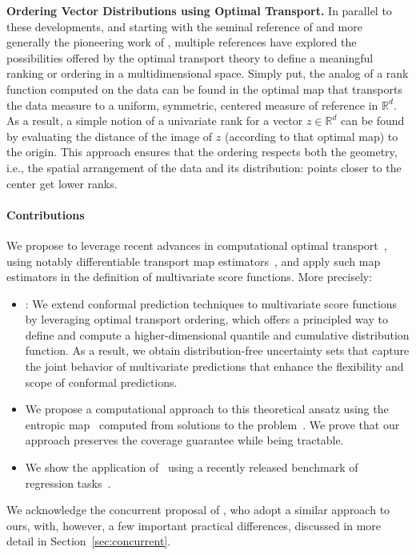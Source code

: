 \textbf{Ordering Vector Distributions using Optimal Transport.} In parallel to these developments, and starting with the seminal reference of \citep{chernozhukov2017} and more generally the pioneering work of \citep{hallin2021,hallin2022center,hallin2023efficient}, multiple references have explored the possibilities offered by the optimal transport theory to define a meaningful ranking or ordering in a multidimensional space. Simply put, the analog of a rank function computed on the data can be found in the optimal \citeauthor{Bre91} map that transports the data measure to a uniform, symmetric, centered measure of reference in $\mathbb{R}^d$. As a result, a simple notion of a univariate rank for a vector $z\in\mathbb{R}^d$ can be found by evaluating the distance of the image of $z$ (according to that optimal map) to the origin. This approach ensures that the ordering respects both the geometry, i.e., the spatial arrangement of the data and its distribution: points closer to the center get lower ranks.

\paragraph{Contributions}
We propose to leverage recent advances in computational optimal transport~\citep{PeyCut19}, using notably differentiable transport map estimators~\citep{pooladian2021entropic,cuturi2019differentiable}, and apply such map estimators in the definition of multivariate score functions. More precisely:
\begin{itemize}[leftmargin=.2cm,itemsep=.0cm,topsep=0cm,parsep=2pt]
\item \OTCP: We extend conformal prediction techniques to multivariate score functions by leveraging optimal transport ordering, which offers a principled way to define and compute a higher-dimensional quantile and cumulative distribution function. As a result, we obtain distribution-free uncertainty sets that capture the joint behavior of multivariate predictions that enhance the flexibility and scope of conformal predictions.
\item We propose a computational approach to this theoretical ansatz using the entropic map~\citep{pooladian2021entropic} computed from solutions to the \citeauthor{Sinkhorn64} problem~\citep{cuturi2013sinkhorn}. We prove that our approach preserves the coverage guarantee while being tractable.
\item We show the application of \OTCP\ using a recently released benchmark of regression tasks~\citep{dheur2025multioutputconformalregressionunified}.
\end{itemize}
We acknowledge the concurrent proposal of \citet{thurin2025optimaltransportbasedconformalprediction}, who adopt a similar approach to ours, with, however, a few important practical differences, discussed in more detail in Section~\ref{sec:concurrent}.
